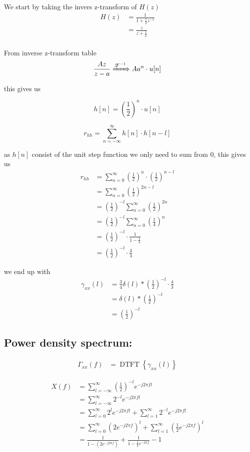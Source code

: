 We start by taking the invers z-transform of $H(z)$
$$
\begin{aligned}
    H(z)&=\frac{1}{1+\frac{1}{2} z^{-1}}\\
    &=\frac{z}{z+\frac{1}{2}}\\
\end{aligned}
$$

From inverse z-transform table
$$\frac{Az}{z-a}\xRightarrow{\mathscr{Z}^{-1}}Aa^n \cdot u[n]$$

this gives us

$$h[n]=\left(\frac{1}{2}\right)^n\cdot u[n]$$

$$r_{hh}=\sum_{n=-\infty}^{\infty}h[n]\cdot h[n-l]$$

as $h[n]$ consist of the unit step function we only need to sum from 0, this gives us 
$$\begin{aligned}
    r_{hh}&=\sum_{n=0}^{\infty}\left(\frac{1}{2}\right)^n\cdot \left(\frac{1}{2}\right)^{n-l}\\
    &=\sum_{n=0}^{\infty}\left(\frac{1}{2}\right)^{2n-l}\\
    &=\left(\frac{1}{2}\right)^{-l}\sum_{n=0}^{\infty}\left(\frac{1}{2}\right)^{2n}\\
    &=\left(\frac{1}{2}\right)^{-l}\sum_{n=0}^{\infty}\left(\frac{1}{4}\right)^{n}\\
    &=\left(\frac{1}{2}\right)^{-l}\cdot\frac{1}{1-\frac{1}{4}}\\
    &=\left(\frac{1}{2}\right)^{-l}\cdot\frac{4}{3}
\end{aligned}$$

we end up with 
$$\begin{aligned}
    \gamma_{x x}(l)&=\frac{3}{4}\delta(l)*\left(\frac{1}{2}\right)^{-l}\cdot\frac{4}{3}\\
    &=\delta(l)*\left(\frac{1}{2}\right)^{-l}\\
    &=\left(\frac{1}{2}\right)^{-l}
\end{aligned}$$

\subsection*{Power density spectrum:}
$$
\begin{aligned}
\Gamma_{x x}(f) & =\operatorname{DTFT}\left\{\gamma_{x x}(l)\right\}
\end{aligned}
$$

$$\begin{aligned}
    X(f)&=\sum_{l=-\infty}^{\infty}\left(\frac{1}{2}\right)^{-l}e^{-j2\pi f l}\\
    &=\sum_{l=-\infty}^{\infty}2^{-l}e^{-j2\pi f l}\\
    &=\sum_{l=0}^{\infty}2^{l}e^{-j2\pi f l}+\sum_{l=1}^{\infty}2^{-l}e^{-j2\pi fl}\\
    &=\sum_{l=0}^{\infty}\left(2e^{-j2\pi f}\right)^l+\sum_{l=1}^{\infty}\left(\frac{1}{2}e^{-j2\pi f }\right)^l\\
    &=\frac{1}{1-\left(2e^{-j2\pi f}\right)}+\frac{1}{1-\frac{1}{2}e^{-2\pi f}}-1
\end{aligned}$$

